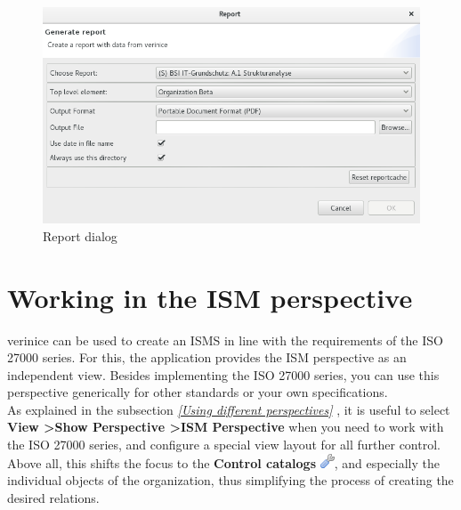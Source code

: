 \documentclass[a4paper,10pt]{book}
\begin{document}
\begin{figure}[htb!]
  \centering
  \includegraphics[scale=.35]{Screenshot/Report_erzeugen-en.png}
  \caption{\label {Report view} Report dialog}
\end{figure}
\newline


\chapter{Working in the ISM perspective} \label{Working in the ISM perspective}
verinice can be used to create an ISMS in line with the requirements of the ISO 27000 series. For this,
the application provides the ISM perspective as an independent view. Besides implementing the ISO 27000
series, you can use this perspective generically for other standards or your own specifications.
\newline\\
As explained in the subsection {\em \ref{Using different perspectives}  },
it is useful to select \textbf{View \textgreater Show Perspective \textgreater ISM Perspective}
when you need to work with the ISO 27000 series, and configure a special view layout for all further control.
Above all, this shifts the focus to the \textbf{Control catalogs} \includegraphics[height=2ex]{Icon/Control_Kataloge.png},
and especially the individual objects of the organization, thus simplifying the process of creating the desired
relations.
\end{document}
